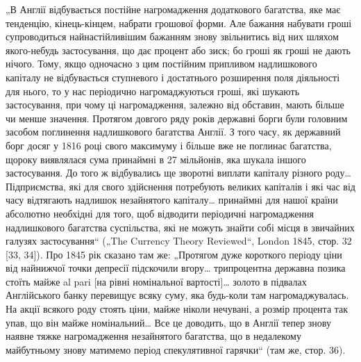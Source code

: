 „В Англії відбувається постійне нагромадження додаткового
багатства, яке має тенденцію, кінець-кінцем, набрати грошової
форми. Але бажання набувати гроші супроводиться найнастійливішим бажанням знову звільнитись від них
шляхом якого-небудь
застосування, що дає процент або зиск; бо гроші як гроші не
дають нічого. Тому, якщо одночасно з цим постійним припливом надлишкового капіталу не відбувається
ступневого і достатнього розширення поля діяльності для нього, то у нас
періодично нагромаджуються гроші, які шукають застосування,
при чому ці нагромадження, залежно від обставин, мають
більше чи менше значення. Протягом довгого ряду років державні борги були головним засобом
поглинення надлишкового
багатства Англії. З того часу, як державний борг досяг у
1816 році свого максимуму і більше вже не поглинає багатства, щороку виявлялася сума принаймні в 27
мільйонів, яка
шукала іншого застосування. До того ж відбувались ще зворотні
виплати капіталу різного роду\dots{} Підприємства, які для свого
здійснення потребують великих капіталів і які час від часу
відтягають надлишок незайнятого капіталу\dots{} принаймні для нашої країни абсолютно необхідні для того,
щоб відводити періодичні нагромадження надлишкового багатства суспільства, які не
можуть знайти собі місця в звичайних галузях застосування“
(„The Currency Theory Reviewed“, London 1845, стор. 32 [33, 34]).
Про 1845 рік сказано там же: „Протягом дуже короткого періоду ціни від найнижчої точки депресії
підскочили вгору\dots{} трипроцентна державна позика стоїть майже al pari [на рівні номінальної
вартості]\dots{} золото в підвалах Англійського банку перевищує всяку суму, яка будь-коли там
нагромаджувалась. На
акції всякого роду стоять ціни, майже ніколи нечувані, а розмір
процента так упав, що він майже номінальний\dots{} Все це доводить,
що в Англії тепер знову наявне тяжке нагромадження незайнятого
багатства, що в недалекому майбутньому знову матимемо період
спекулятивної гарячки“ (там же, стор. 36).

